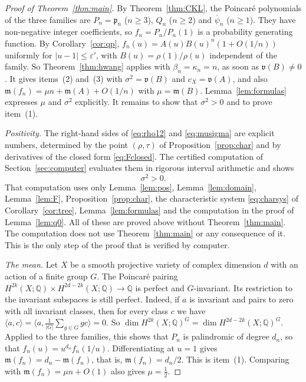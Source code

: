 \documentclass[11pt]{amsart}
\theoremstyle{definition}
\theoremstyle{remark}
\numberwithin{equation}{section}
\newcommand{\QQ}{\mathbb{Q}}
\newcommand{\mean}{\mathfrak{m}}
\newcommand{\var}{\mathfrak{v}}
\newcommand{\pp}{\mathfrak{p}}
\newcommand{\psibar}{\overline{\psi}}
\newcommand{\abs}[1]{\lvert #1\rvert}
\begin{document}
\begin{proof}[Proof of Theorem~\ref{thm:main}]
By Theorem~\ref{thm:CKL}, the Poincar\'e polynomials of the three families are \(P_n=\pp_n\) (\(n\ge3\)), \(Q_n\) (\(n\ge2\)) and \(\psibar_n\) (\(n\ge1\)). They have non-negative integer coefficients, so \(f_n=P_n/P_n(1)\) is a probability generating function. By Corollary~\ref{cor:qp}, \(f_n(u)=A(u)B(u)^n(1+O(1/n))\) uniformly for \(\abs{u-1}\le\varepsilon'\), with \(B(u)=\rho(1)/\rho(u)\) independent of the family. So Theorem~\ref{thm:hwang} applies with \(\beta_n=\kappa_n=n\), as soon as \(\var(B)\ne0\). It gives items~(2) and~(3) with \(\sigma^2=\var(B)\) and \(c_X=\var(A)\), and also \(\mean(f_n)=\mu n+\mean(A)+O(1/n)\) with \(\mu=\mean(B)\). Lemma~\ref{lem:formulas} expresses \(\mu\) and \(\sigma^2\) explicitly. It remains to show that \(\sigma^2>0\) and to prove item~(1).

\emph{Positivity.} The right-hand sides of \eqref{eq:rho12} and \eqref{eq:musigma} are explicit numbers, determined by the point \((\rho,\tau)\) of Proposition~\ref{prop:char} and by derivatives of the closed form \eqref{eq:Fclosed}. The certified computation of Section~\ref{sec:computer} evaluates them in rigorous interval arithmetic and shows
\begin{equation}\label{eq:pos}
\sigma^2>0 .
\end{equation}
That computation uses only Lemma~\ref{lem:pos}, Lemma~\ref{lem:domain}, Lemma~\ref{lem:F}, Proposition~\ref{prop:char}, the characteristic system \eqref{eq:charsys} of Corollary~\ref{cor:tree}, Lemma~\ref{lem:formulas} and the computation in the proof of Lemma~\ref{lem:q0}. All of these are proved above without Theorem~\ref{thm:main}. The computation does not use Theorem~\ref{thm:main} or any consequence of it. This is the only step of the proof that is verified by computer.

\emph{The mean.} Let \(X\) be a smooth projective variety of complex dimension \(d\) with an action of a finite group \(G\). The Poincar\'e pairing \(H^{2k}(X;\QQ)\times H^{2d-2k}(X;\QQ)\to\QQ\) is perfect and \(G\)-invariant. Its restriction to the invariant subspaces is still perfect. Indeed, if \(a\) is invariant and pairs to zero with all invariant classes, then for every class \(c\) we have \(\langle a,c\rangle=\langle a,\frac1{\abs{G}}\sum_{g\in G}gc\rangle=0\). So \(\dim H^{2k}(X;\QQ)^G=\dim H^{2d-2k}(X;\QQ)^G\). Applied to the three families, this shows that \(P_n\) is palindromic of degree \(d_n\), so that \(f_n(u)=u^{d_n}f_n(1/u)\). Differentiating at \(u=1\) gives \(\mean(f_n)=d_n-\mean(f_n)\), that is, \(\mean(f_n)=d_n/2\). This is item~(1). Comparing with \(\mean(f_n)=\mu n+O(1)\) also gives \(\mu=\frac12\).
\end{proof}
\end{document}
